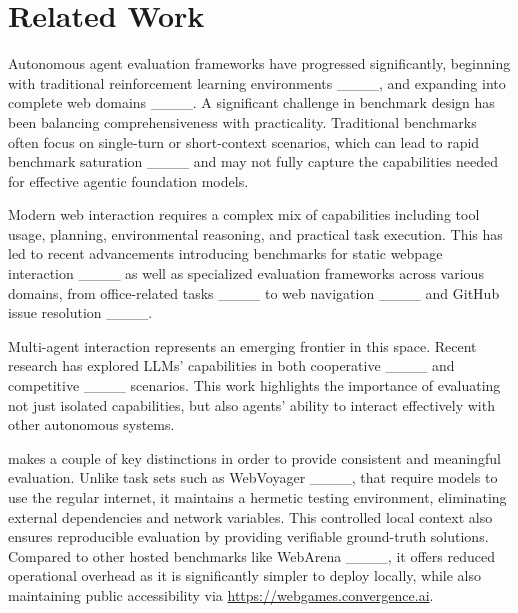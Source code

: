 \section{Related Work}
Autonomous agent evaluation frameworks have progressed significantly, beginning with traditional reinforcement learning environments ____, and expanding into complete web domains ____. 
A significant challenge in benchmark design has been balancing comprehensiveness with practicality. Traditional benchmarks often focus on single-turn or short-context scenarios, which can lead to rapid benchmark saturation ____ and may not fully capture the capabilities needed for effective agentic foundation models.

Modern web interaction requires a complex mix of capabilities including tool usage, planning, environmental reasoning, and practical task execution. This has led to 
recent advancements introducing benchmarks for static webpage interaction ____ as well as specialized evaluation frameworks across various domains, from office-related tasks ____ to web navigation ____ and GitHub issue resolution ____.

Multi-agent interaction represents an emerging frontier in this space. Recent research has explored LLMs' capabilities in both cooperative ____ and competitive ____ scenarios. This work highlights the importance of evaluating not just isolated capabilities, but also agents' ability to interact effectively with other autonomous systems.
 
\name makes a couple of key distinctions in order to provide consistent and meaningful evaluation. Unlike task sets such as WebVoyager ____, that require models to use the regular internet, it maintains a hermetic testing environment, eliminating external dependencies and network variables. This controlled local context also ensures reproducible evaluation by providing verifiable ground-truth solutions. Compared to other hosted benchmarks like WebArena ____, it offers reduced operational overhead as it is significantly simpler to deploy locally, while also maintaining public accessibility via \url{https://webgames.convergence.ai}.